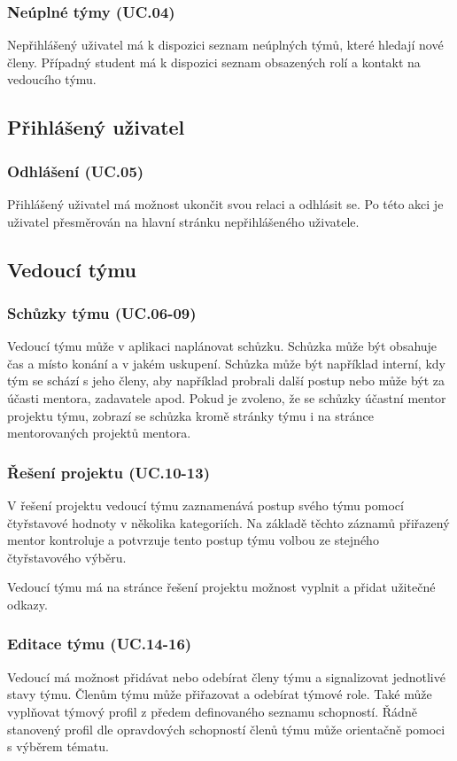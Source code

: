 \documentclass[czech,BP]{thesiskiv}
\begin{document}
			\subsubsection{Neúplné týmy (UC.04)}
				\par Nepřihlášený uživatel má k dispozici seznam neúplných týmů, které hledají nové členy. Případný student má k dispozici seznam obsazených rolí a kontakt na vedoucího týmu.
		\subsection{Přihlášený uživatel}
			\subsubsection{Odhlášení (UC.05)}
				\par Přihlášený uživatel má možnost ukončit svou relaci a odhlásit se. Po této akci je uživatel přesměrován na hlavní stránku nepřihlášeného uživatele.
		\subsection{Vedoucí týmu}
			\subsubsection{Schůzky týmu (UC.06-09)}
				\par Vedoucí týmu může v aplikaci naplánovat schůzku. Schůzka může být obsahuje čas a místo konání a v jakém uskupení. Schůzka může být například interní, kdy tým se schází s jeho členy, aby například probrali další postup nebo může být za účasti mentora, zadavatele apod. Pokud je zvoleno, že se schůzky účastní mentor projektu týmu, zobrazí se schůzka kromě stránky týmu i na stránce mentorovaných projektů mentora.
			\subsubsection{Řešení projektu (UC.10-13)}
				\par V řešení projektu vedoucí týmu zaznamenává postup svého týmu pomocí čtyřstavové hodnoty v několika kategoriích. Na základě těchto záznamů přiřazený mentor kontroluje a potvrzuje tento postup týmu volbou ze stejného čtyřstavového výběru.
				\par Vedoucí týmu má na stránce řešení projektu možnost vyplnit a přidat užitečné odkazy.
			\subsubsection{Editace týmu (UC.14-16)}
				\par Vedoucí má možnost přidávat nebo odebírat členy týmu a signalizovat jednotlivé stavy týmu. Členům týmu může přiřazovat a odebírat týmové role. Také může vyplňovat týmový profil z předem definovaného seznamu schopností. Řádně stanovený profil dle opravdových schopností členů týmu může orientačně pomoci s výběrem tématu.
\end{document}
